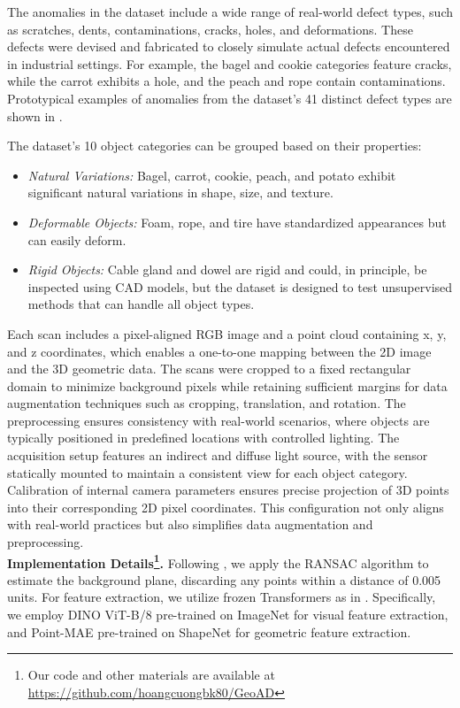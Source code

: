 The anomalies in the dataset include a wide range of real-world defect types, such as scratches, dents, contaminations, cracks, holes, and deformations. These defects were devised and fabricated to closely simulate actual defects encountered in industrial settings. For example, the bagel and cookie categories feature cracks, while the carrot exhibits a hole, and the peach and rope contain contaminations. Prototypical examples of anomalies from the dataset's 41 distinct defect types are shown in \cite{bergmann2022mvtec}.  

The dataset's 10 object categories can be grouped based on their properties:
\begin{itemize}
    \item \textit{Natural Variations:} Bagel, carrot, cookie, peach, and potato exhibit significant natural variations in shape, size, and texture.
    \item \textit{Deformable Objects:} Foam, rope, and tire have standardized appearances but can easily deform.
    \item \textit{Rigid Objects:} Cable gland and dowel are rigid and could, in principle, be inspected using CAD models, but the dataset is designed to test unsupervised methods that can handle all object types.
\end{itemize}

Each scan includes a pixel-aligned RGB image and a point cloud containing x, y, and z coordinates, which enables a one-to-one mapping between the 2D image and the 3D geometric data. The scans were cropped to a fixed rectangular domain to minimize background pixels while retaining sufficient margins for data augmentation techniques such as cropping, translation, and rotation. The preprocessing ensures consistency with real-world scenarios, where objects are typically positioned in predefined locations with controlled lighting. The acquisition setup features an indirect and diffuse light source, with the sensor statically mounted to maintain a consistent view for each object category. Calibration of internal camera parameters ensures precise projection of 3D points into their corresponding 2D pixel coordinates. This configuration not only aligns with real-world practices but also simplifies data augmentation and preprocessing. \\

\noindent \textbf{Implementation Details\footnote{Our code and other materials are available at \url{https://github.com/hoangcuongbk80/GeoAD}}.} Following \cite{wang2023multimodal}, we apply the RANSAC algorithm \cite{fischler1981random} to estimate the background plane, discarding any points within a distance of 0.005 units. For feature extraction, we utilize frozen Transformers as in \cite{wang2023multimodal}. Specifically, we employ DINO ViT-B/8 \cite{dosovitskiy2020image} pre-trained on ImageNet \cite{deng2009imagenet} for visual feature extraction, and Point-MAE \cite{pang2022masked} pre-trained on ShapeNet \cite{chang2015shapenet} for geometric feature extraction. 

